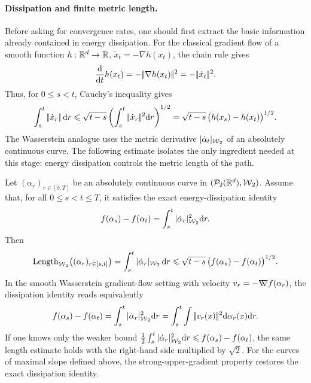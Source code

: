
\paragraph{Dissipation and finite metric length.}

Before asking for convergence rates, one should first extract the basic information already contained in energy dissipation. For the classical gradient flow of a smooth function $h:\mathbb{R}^d\to\mathbb{R}$, $\dot x_t=-\nabla h(x_t)$, the chain rule gives
\[
	\frac{\mathrm{d}}{\mathrm{d} t}h(x_t)
	=
	-|\!| \nabla h(x_t) |\!|^2
	=
	-|\!| \dot x_t |\!|^2.
\]
Thus, for $0\leq s<t$, Cauchy's inequality gives
\begin{equation}\label{eq-euclidean-gradient-flow-length}
	\int_s^t |\!| \dot x_r |\!|\,\mathrm{d} r
	\leqslant
	\sqrt{t-s}\left(\int_s^t|\!| \dot x_r |\!|^2\mathrm{d} r\right)^{1/2}
	=
	\sqrt{t-s}\,\bigl(h(x_s)-h(x_t)\bigr)^{1/2}.
\end{equation}
The Wasserstein analogue uses the metric derivative $|\dot\alpha_t|_{\operatorname{\mathcal{W}}_2}$ of an absolutely continuous curve. The following estimate isolates the only ingredient needed at this stage: energy dissipation controls the metric length of the path.

\begin{prop}\label{prop-gradient-flow-finite-length}
	Let $(\alpha_r)_{r\in[0,T]}$ be an absolutely continuous curve in $(\mathcal{P}_2(\mathbb{R}^d),\operatorname{\mathcal{W}}_2)$. Assume that, for all $0\leq s<t\leq T$, it satisfies the exact energy-dissipation identity
	\[
		f(\alpha_s)-f(\alpha_t)
		=
		\int_s^t |\dot\alpha_r|_{\operatorname{\mathcal{W}}_2}^2\mathrm{d} r.
	\]
	Then
	\begin{equation}\label{eq-wasserstein-gradient-flow-length}
		\operatorname{Length}_{\operatorname{\mathcal{W}}_2}\bigl((\alpha_r)_{r\in[s,t]}\bigr)
		=
		\int_s^t |\dot\alpha_r|_{\operatorname{\mathcal{W}}_2}\,\mathrm{d} r
		\leqslant
		\sqrt{t-s}\,\bigl(f(\alpha_s)-f(\alpha_t)\bigr)^{1/2}.
	\end{equation}
	In the smooth Wasserstein gradient-flow setting with velocity $v_r=-\mathord{\nabla\mkern-9.3mu\nabla} f(\alpha_r)$, the dissipation identity reads equivalently
	\[
		f(\alpha_s)-f(\alpha_t)
		=
		\int_s^t |\dot\alpha_r|_{\operatorname{\mathcal{W}}_2}^2\mathrm{d} r
		=
		\int_s^t\int |\!| v_r(x) |\!|^2\mathrm{d}\alpha_r(x)\mathrm{d} r.
	\]
	If one knows only the weaker bound $\frac12\int_s^t|\dot\alpha_r|_{\operatorname{\mathcal{W}}_2}^2\mathrm{d} r\leqslant f(\alpha_s)-f(\alpha_t)$, the same length estimate holds with the right-hand side multiplied by $\sqrt2$. For the curves of maximal slope defined above, the strong-upper-gradient property restores the exact dissipation identity.
\end{prop}


